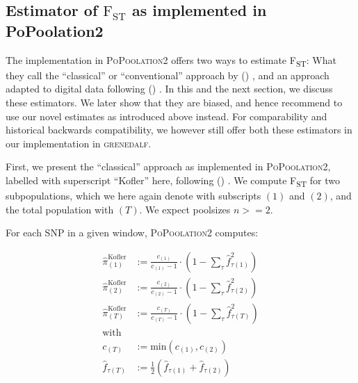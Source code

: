 \documentclass[a4paper,fontsize=9pt,DIV=14]{scrartcl}
\newcounter{todo}
\newcommand\todo[1]{}
\newcommand\toolname{\textsc}
\newcommand\secref[1]{Section~\ref{#1}}
\newcommand{\coverage}{c}
\newcommand{\empfreq}{\widehat{f}}
\newcommand{\fst}{F\textsubscript{ST}}
\newcommand\citeay[1]{\citeauthor{#1} (\citeyear{#1}) \cite{#1}}
\begin{document}

\subsection{Estimator of \texorpdfstring{$\text{F}_\text{ST}$}{FST} as implemented in PoPoolation2}
\label{supp:sec:FST:sub:PoPoolation2Estimator}

The implementation in \toolname{PoPoolation2} \cite{Kofler2011b} offers two ways to estimate \fst{}:
What they call the ``classical'' or ``conventional'' approach by \citeay{Hartl2007}, and an approach adapted to digital data following \citeay{Karlsson2007}.
In this and the next section, we discuss these estimators.
We later show that they are biased, and hence recommend to use our novel estimates as introduced above instead.
For comparability and historical backwards compatibility, we however still offer both these estimators in our implementation in \toolname{grenedalf}.


First, we present the ``classical'' approach as implemented in \toolname{PoPoolation2}, labelled with superscript ``Kofler'' here, following \citeay{Kofler2011b}.
We compute \fst{} for two subpopulations, which we here again denote with subscripts $(1)$ and $(2)$, and the total population with $(T)$. We expect poolsizes $n >= 2$.

For each SNP in a given window, \toolname{PoPoolation2} computes:

\begin{align}
    \label{eq:PoPoolation2FstPi:1}
    \widehat{\pi}_{(1)}^\text{Kofler}  &:= \frac{\coverage_{(1)}}{\coverage_{(1)}-1} \cdot  \left( 1 - \sum_\tau \empfreq_{\tau(1)}^2 \right) \\
    \label{eq:PoPoolation2FstPi:2}
    \widehat{\pi}_{(2)}^\text{Kofler}  &:= \frac{\coverage_{(2)}}{\coverage_{(2)}-1} \cdot  \left( 1 - \sum_\tau \empfreq_{\tau(2)}^2 \right) \\
    \label{eq:PoPoolation2FstPi:T}
    \widehat{\pi}_{(T)}^\text{Kofler}  &:= \frac{\coverage_{(T)}}{\coverage_{(T)}-1} \cdot  \left( 1 - \sum_\tau \empfreq_{\tau(T)}^2 \right) \\
    \nonumber
    \mbox{with} \\
    \nonumber
    \coverage_{(T)} &:= \mbox{min} \left( \coverage_{(1)}, \coverage_{(2)} \right) \\
    \nonumber
    \empfreq_{\tau(T)} &:= \frac{1}{2} \left( \empfreq_{\tau(1)} + \empfreq_{\tau(2)} \right)
\end{align}
\end{document}
